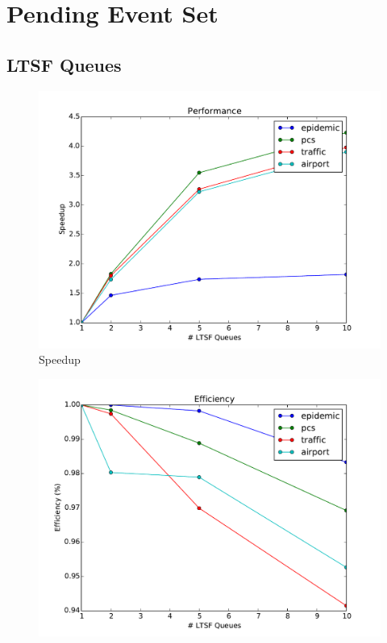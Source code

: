 \documentclass[11pt]{book}
\begin{document}
\section{Pending Event Set}

\subsection{LTSF Queues}

\begin{figure}
  \begin{minipage}{.5\textwidth}
    \begin{center}
      \includegraphics[width=\textwidth,keepaspectratio]{figs/pending_event_set/ltsf_speedup.pdf} \\
      Speedup \\
    \end{center}
  \end{minipage} \hfill
  \begin{minipage}{.5\textwidth}
    \begin{center}
      \includegraphics[width=\textwidth,keepaspectratio]{figs/pending_event_set/ltsf_efficiency.pdf} \\

\end{center}
\end{minipage}
\end{figure}
\end{document}
